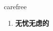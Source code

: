 
\begin{frame}
{\huge carefree}
\begin{center}
\begin{enumerate}\Large
  \item \textbf{无忧无虑的}
\end{enumerate}
\end{center}
\end{frame}
